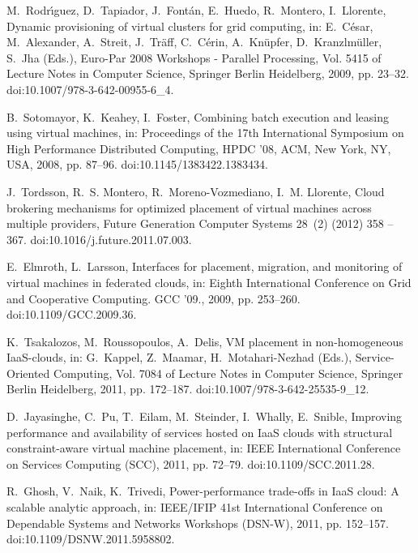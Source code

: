 \documentclass[sort, compress, 5p]{elsarticle}
\begin{document}
\begin{thebibliography}{10}
M.~Rodr{\'\i}guez, D.~Tapiador, J.~Font{\'a}n, E.~Huedo, R.~Montero,
  I.~Llorente, Dynamic provisioning of virtual clusters for grid computing, in:
  E.~C{\'e}sar, M.~Alexander, A.~Streit, J.~Tr{\"a}ff, C.~C{\'e}rin,
  A.~Kn{\"u}pfer, D.~Kranzlm{\"u}ller, S.~Jha (Eds.), Euro-Par 2008 Workshops -
  Parallel Processing, Vol. 5415 of Lecture Notes in Computer Science, Springer
  Berlin Heidelberg, 2009, pp. 23--32.
\newblock doi:10.1007/978-3-642-00955-6\_4.

B.~Sotomayor, K.~Keahey, I.~Foster, Combining batch execution and leasing using
  virtual machines, in: Proceedings of the 17th International Symposium on High
  Performance Distributed Computing, HPDC '08, ACM, New York, NY, USA, 2008,
  pp. 87--96.
\newblock doi:10.1145/1383422.1383434.

J.~Tordsson, R.~S. Montero, R.~Moreno-Vozmediano, I.~M. Llorente, Cloud
  brokering mechanisms for optimized placement of virtual machines across
  multiple providers, Future Generation Computer Systems 28~(2) (2012) 358 --
  367.
\newblock doi:10.1016/j.future.2011.07.003.

E.~Elmroth, L.~Larsson, Interfaces for placement, migration, and monitoring of
  virtual machines in federated clouds, in: Eighth International Conference on
  Grid and Cooperative Computing. GCC '09., 2009, pp. 253--260.
\newblock doi:10.1109/GCC.2009.36.

K.~Tsakalozos, M.~Roussopoulos, A.~Delis, {VM} placement in non-homogeneous
  {IaaS}-clouds, in: G.~Kappel, Z.~Maamar, H.~Motahari-Nezhad (Eds.),
  Service-Oriented Computing, Vol. 7084 of Lecture Notes in Computer Science,
  Springer Berlin Heidelberg, 2011, pp. 172--187.
\newblock doi:10.1007/978-3-642-25535-9\_12.

D.~Jayasinghe, C.~Pu, T.~Eilam, M.~Steinder, I.~Whally, E.~Snible, Improving
  performance and availability of services hosted on {IaaS} clouds with
  structural constraint-aware virtual machine placement, in: IEEE International
  Conference on Services Computing (SCC), 2011, pp. 72--79.
\newblock doi:10.1109/SCC.2011.28.

R.~Ghosh, V.~Naik, K.~Trivedi, Power-performance trade-offs in {IaaS} cloud: A
  scalable analytic approach, in: IEEE/IFIP 41st International Conference on
  Dependable Systems and Networks Workshops (DSN-W), 2011, pp. 152--157.
\newblock doi:10.1109/DSNW.2011.5958802.


\end{thebibliography}
\end{document}
